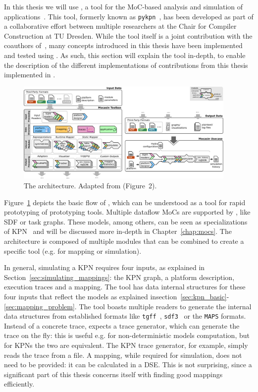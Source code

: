 In this thesis we will use \mocasin, a tool for the \ac{MoC}-based analysis and simulation of applications~\cite{menard_rapido21}.
This tool, formerly known as \texttt{pykpn}~\cite{menard_norcas16,goens_mcsoc18}, has been developed as part of a collaborative effort between multiple researchers at the Chair for Compiler Construction at TU Dresden.
While the tool itself is a joint contribution with the coauthors of~\cite{menard_rapido21}, many concepts introduced in this thesis have been implemented and tested using \mocasin.
As such, this section will explain the tool in-depth, to enable the description of the different implementations of contributions from this thesis implemented in \mocasin.

\begin{figure}[h]
	\centering
   \includegraphics[width=0.95\textwidth]{figures/mocasin.pdf}
	\caption{The \mocasin architecture. Adapted from \cite{menard_rapido21} (Figure~2).}
	\label{fig:mocasin_arch}
\end{figure}


Figure~\ref{fig:mocasin_arch} depicts the basic flow of \mocasin,
which can be understood as a tool for rapid prototyping of prototyping tools.
Multiple dataflow \acp{MoC} are supported by \mocasin, like \ac{SDF} or task graphs.
These models, among others, can be seen as specializations of \ac{KPN}~\cite{lee1995dataflow} and will be discussed more in-depth in Chapter~\ref{chap:mocs}.
The \mocasin architecture is composed of multiple modules that can be combined to create a specific tool (e.g. for mapping or simulation). 

In general, simulating a KPN requires four inputs, as explained in Section~\ref{sec:simulating_mappings}: the \ac{KPN} graph, a platform description, execution traces and a mapping.
The \mocasin tool has data internal structures for these four inputs that reflect the models as explained insection~\ref{sec:kpn_basic}-\ref{sec:mapping_problem}.
The tool boasts multiple readers to generate the internal data structures from established formats like \texttt{tgff}~\cite{tgff}, \texttt{sdf3}~\cite{sdf3} or the \texttt{MAPS} formats. \index{\acs*{\SDFFF}}
Instead of a concrete trace, \mocasin expects a trace generator, which can generate the trace on the fly: this is useful e.g. for non-deterministic models computation, but for KPNs the two are equivalent.
The \ac{KPN} trace generator, for example, simply reads the trace from a file.
A mapping, while required for simulation, does not need to be provided: it can be calculated in a \acl{DSE}.
This is not surprising, since a significant part of this thesis concerns itself with finding good mappings efficiently.

